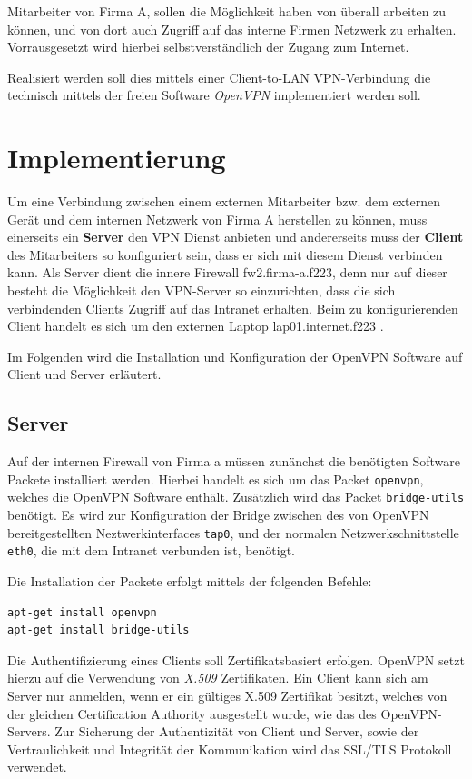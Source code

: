 Mitarbeiter von Firma A, sollen die Möglichkeit haben von überall arbeiten zu können, und von dort auch Zugriff auf das interne Firmen Netzwerk zu erhalten.
Vorrausgesetzt wird hierbei selbstverständlich der Zugang zum Internet.

Realisiert werden soll dies mittels einer Client-to-LAN VPN-Verbindung die technisch mittels der freien Software \emph{OpenVPN} implementiert werden soll.

\section{Implementierung}

Um eine Verbindung zwischen einem externen Mitarbeiter bzw. dem externen Gerät und dem internen Netzwerk von Firma A herstellen zu können, muss einerseits ein \textbf{Server} den VPN Dienst anbieten und andererseits muss der \textbf{Client} des Mitarbeiters so konfiguriert sein, dass er sich mit diesem Dienst verbinden kann.
Als Server dient die innere Firewall fw2.firma-a.f223, denn nur auf dieser besteht die Möglichkeit den VPN-Server so einzurichten, dass die sich verbindenden Clients Zugriff auf das Intranet erhalten.
Beim zu konfigurierenden Client handelt es sich um den externen Laptop lap01.internet.f223 \cite{Neuschwander2014}.

Im Folgenden wird die Installation und Konfiguration der OpenVPN Software auf Client und Server erläutert.


\subsection{Server}\label{vpn:server}

Auf der internen Firewall von Firma a müssen zunänchst die benötigten Software Packete installiert werden. Hierbei handelt es sich um das Packet \texttt{openvpn}, welches die OpenVPN Software enthält. Zusätzlich wird das Packet \texttt{bridge-utils} benötigt.
Es wird zur Konfiguration der Bridge zwischen des von OpenVPN bereitgestellten Neztwerkinterfaces \texttt{tap0}, und der normalen Netzwerkschnittstelle \texttt{eth0}, die mit dem Intranet verbunden ist, benötigt.

Die Installation der Packete erfolgt mittels der folgenden Befehle:

\begin{lstlisting}
apt-get install openvpn
apt-get install bridge-utils
\end{lstlisting}

Die Authentifizierung eines Clients soll Zertifikatsbasiert erfolgen. OpenVPN setzt hierzu auf die Verwendung von \emph{X.509} Zertifikaten. Ein Client kann sich am Server nur anmelden, wenn er ein gültiges X.509 Zertifikat besitzt, welches von der gleichen Certification Authority ausgestellt wurde, wie das des OpenVPN-Servers. Zur Sicherung der Authentizität von Client und Server, sowie der Vertraulichkeit und Integrität der Kommunikation wird das SSL/TLS Protokoll verwendet. 

